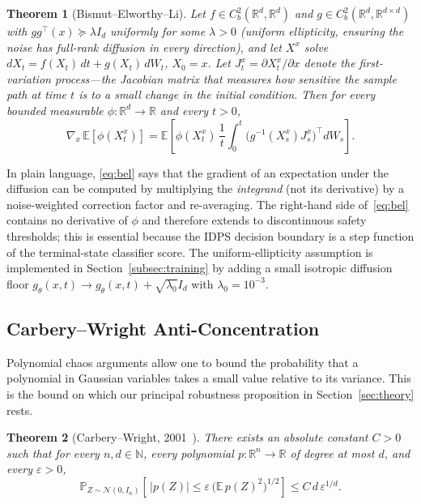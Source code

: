 \documentclass[journal,10pt]{IEEEtran}
\newtheorem{theorem}{Theorem}
\theoremstyle{definition}
\theoremstyle{remark}
\newcommand{\Real}{\mathbb{R}}
\newcommand{\Exp}{\mathbb{E}}
\newcommand{\Prob}{\mathbb{P}}
\newcommand{\Ncal}{\mathcal{N}}
\begin{document}
\begin{theorem}[Bismut--Elworthy--Li]\label{thm:bel}
Let $f\in C^2_b(\Real^d,\Real^d)$ and $g\in C^2_b(\Real^d,\Real^{d\times d})$
with $gg^\top(x)\succeq\lambda I_d$ uniformly for some $\lambda>0$
(uniform ellipticity, ensuring the noise has full-rank diffusion in
every direction), and let $X^x$ solve
$dX_t=f(X_t)\,dt+g(X_t)\,dW_t$, $X_0=x$. Let $J^x_t=\partial X^x_t/\partial x$
denote the first-variation process---the Jacobian matrix that measures
how sensitive the sample path at time $t$ is to a small change in the
initial condition. Then for every bounded measurable
$\phi:\Real^d\!\to\!\Real$ and every $t>0$,
\begin{equation}\label{eq:bel}
  \nabla_x\,\Exp[\phi(X^x_t)]
  = \Exp\!\left[\phi(X^x_t)\,\frac{1}{t}\!\int_0^t\!
      \!\bigl(g^{-1}(X^x_s)J^x_s\bigr)^{\!\top}\!dW_s\right].
\end{equation}
\end{theorem}

In plain language, \eqref{eq:bel} says that the gradient of an
expectation under the diffusion can be computed by multiplying the
\emph{integrand} (not its derivative) by a noise-weighted correction
factor and re-averaging. The right-hand side of~\eqref{eq:bel}
contains no derivative of $\phi$ and therefore extends to discontinuous
safety thresholds; this is essential because the IDPS decision boundary
is a step function of the terminal-state classifier score. The
uniform-ellipticity assumption is implemented in
Section~\ref{subsec:training} by adding a small isotropic
diffusion floor $g_\theta(x,t)\to g_\theta(x,t)+\sqrt{\lambda_0}I_d$
with $\lambda_0=10^{-3}$.

\subsection{Carbery--Wright Anti-Concentration}\label{subsec:cw}
Polynomial chaos arguments allow one to bound the probability that a
polynomial in Gaussian variables takes a small value relative to its
variance. This is the bound on which our principal robustness
proposition in Section~\ref{sec:theory} rests.

\begin{theorem}[Carbery--Wright, 2001~\cite{carbery2001anticonc}]\label{thm:cw}
There exists an absolute constant $C>0$ such that for every
$n,d\in\mathbb{N}$, every polynomial $p:\Real^n\!\to\!\Real$ of degree
at most $d$, and every $\varepsilon>0$,
\begin{equation}\label{eq:cw}
  \Prob_{Z\sim\Ncal(0,I_n)}\!\left[\,|p(Z)|\le
   \varepsilon\,\bigl(\Exp\,p(Z)^2\bigr)^{1/2}\right]
   \leq C\,d\,\varepsilon^{1/d}.
\end{equation}
\end{theorem}
\end{document}
